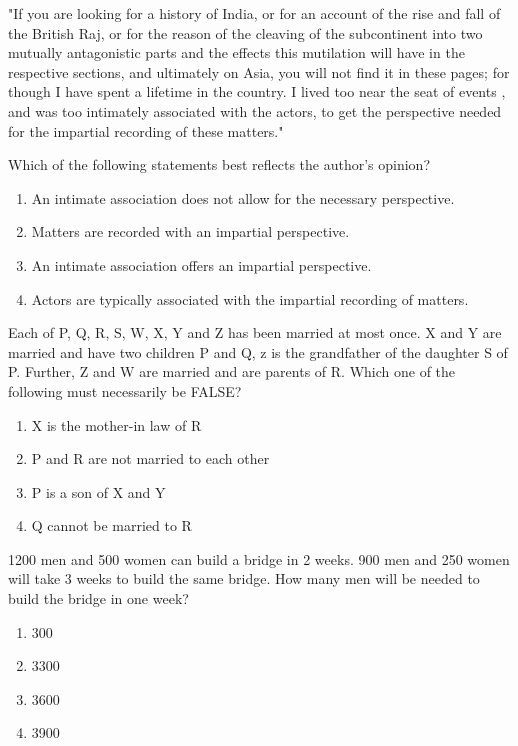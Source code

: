 \item "If you are looking for a history of India, or for an account of the rise and fall of the British Raj, or for the reason of the cleaving of the subcontinent into two mutually antagonistic parts and the effects this mutilation will have in the respective sections, and ultimately on Asia, you will not find it in these pages; for though I have spent a lifetime in the country. I lived too near the seat of events , and was too intimately associated with the actors, to get the perspective needed for the impartial recording of these matters."

Which of the following statements best reflects the author's opinion?
\begin{enumerate}
\item An intimate association does not allow for the necessary perspective.
\item Matters are recorded with an impartial perspective.
\item An intimate association offers an impartial perspective.
\item Actors are typically associated with the impartial recording of matters.
\end{enumerate}

\item Each of P, Q, R, S, W, X, Y and Z has been married at most once. X and Y are married and have two children P and Q, z is the grandfather of the daughter S of P. Further, Z and W are married and are parents of R. Which one of the following must necessarily be FALSE?
\begin{enumerate}
\item X is the mother-in law of R
\item P and R are not married to each other
\item P is a son of X and Y
\item Q cannot be married to R
\end{enumerate}

\item 1200 men and 500 women can build a bridge in 2 weeks. 900 men and 250 women will take 3 weeks to build the same bridge. How many men will be needed to build the bridge in one week?
\begin{enumerate}
\item 300
\item 3300
\item 3600
\item 3900
\end{enumerate}

